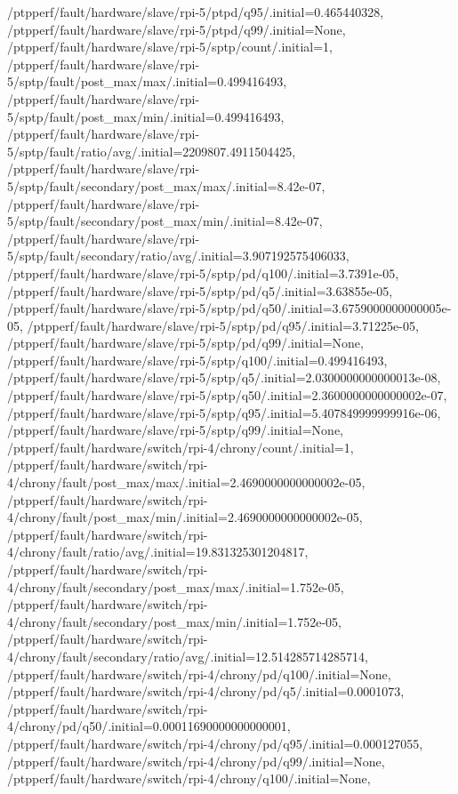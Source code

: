 {    /ptpperf/fault/hardware/slave/rpi-5/ptpd/q95/.initial=0.465440328,
    /ptpperf/fault/hardware/slave/rpi-5/ptpd/q99/.initial=None,
    /ptpperf/fault/hardware/slave/rpi-5/sptp/count/.initial=1,
    /ptpperf/fault/hardware/slave/rpi-5/sptp/fault/post_max/max/.initial=0.499416493,
    /ptpperf/fault/hardware/slave/rpi-5/sptp/fault/post_max/min/.initial=0.499416493,
    /ptpperf/fault/hardware/slave/rpi-5/sptp/fault/ratio/avg/.initial=2209807.4911504425,
    /ptpperf/fault/hardware/slave/rpi-5/sptp/fault/secondary/post_max/max/.initial=8.42e-07,
    /ptpperf/fault/hardware/slave/rpi-5/sptp/fault/secondary/post_max/min/.initial=8.42e-07,
    /ptpperf/fault/hardware/slave/rpi-5/sptp/fault/secondary/ratio/avg/.initial=3.907192575406033,
    /ptpperf/fault/hardware/slave/rpi-5/sptp/pd/q100/.initial=3.7391e-05,
    /ptpperf/fault/hardware/slave/rpi-5/sptp/pd/q5/.initial=3.63855e-05,
    /ptpperf/fault/hardware/slave/rpi-5/sptp/pd/q50/.initial=3.6759000000000005e-05,
    /ptpperf/fault/hardware/slave/rpi-5/sptp/pd/q95/.initial=3.71225e-05,
    /ptpperf/fault/hardware/slave/rpi-5/sptp/pd/q99/.initial=None,
    /ptpperf/fault/hardware/slave/rpi-5/sptp/q100/.initial=0.499416493,
    /ptpperf/fault/hardware/slave/rpi-5/sptp/q5/.initial=2.0300000000000013e-08,
    /ptpperf/fault/hardware/slave/rpi-5/sptp/q50/.initial=2.3600000000000002e-07,
    /ptpperf/fault/hardware/slave/rpi-5/sptp/q95/.initial=5.407849999999916e-06,
    /ptpperf/fault/hardware/slave/rpi-5/sptp/q99/.initial=None,
    /ptpperf/fault/hardware/switch/rpi-4/chrony/count/.initial=1,
    /ptpperf/fault/hardware/switch/rpi-4/chrony/fault/post_max/max/.initial=2.4690000000000002e-05,
    /ptpperf/fault/hardware/switch/rpi-4/chrony/fault/post_max/min/.initial=2.4690000000000002e-05,
    /ptpperf/fault/hardware/switch/rpi-4/chrony/fault/ratio/avg/.initial=19.831325301204817,
    /ptpperf/fault/hardware/switch/rpi-4/chrony/fault/secondary/post_max/max/.initial=1.752e-05,
    /ptpperf/fault/hardware/switch/rpi-4/chrony/fault/secondary/post_max/min/.initial=1.752e-05,
    /ptpperf/fault/hardware/switch/rpi-4/chrony/fault/secondary/ratio/avg/.initial=12.514285714285714,
    /ptpperf/fault/hardware/switch/rpi-4/chrony/pd/q100/.initial=None,
    /ptpperf/fault/hardware/switch/rpi-4/chrony/pd/q5/.initial=0.0001073,
    /ptpperf/fault/hardware/switch/rpi-4/chrony/pd/q50/.initial=0.00011690000000000001,
    /ptpperf/fault/hardware/switch/rpi-4/chrony/pd/q95/.initial=0.000127055,
    /ptpperf/fault/hardware/switch/rpi-4/chrony/pd/q99/.initial=None,
    /ptpperf/fault/hardware/switch/rpi-4/chrony/q100/.initial=None,
}
